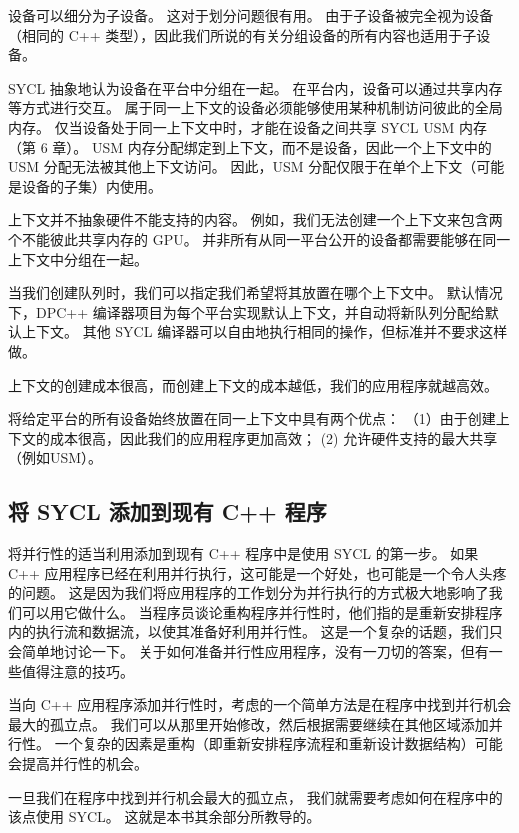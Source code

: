 设备可以细分为子设备。 这对于划分问题很有用。 
由于子设备被完全视为设备（相同的 C++ 类型），因此我们所说的有关分组设备的所有内容也适用于子设备。

SYCL 抽象地认为设备在平台中分组在一起。 在平台内，设备可以通过共享内存等方式进行交互。 
属于同一上下文的设备必须能够使用某种机制访问彼此的全局内存。 
仅当设备处于同一上下文中时，才能在设备之间共享 SYCL USM 内存（第 6 章）。 
USM 内存分配绑定到上下文，而不是设备，因此一个上下文中的 USM 分配无法被其他上下文访问。 
因此，USM 分配仅限于在单个上下文（可能是设备的子集）内使用。

上下文并不抽象硬件不能支持的内容。 
例如，我们无法创建一个上下文来包含两个不能彼此共享内存的 GPU。 
并非所有从同一平台公开的设备都需要能够在同一上下文中分组在一起。

当我们创建队列时，我们可以指定我们希望将其放置在哪个上下文中。 
默认情况下，DPC++ 编译器项目为每个平台实现默认上下文，并自动将新队列分配给默认上下文。 
其他 SYCL 编译器可以自由地执行相同的操作，但标准并不要求这样做。

\begin{remark}
	上下文的创建成本很高，而创建上下文的成本越低，我们的应用程序就越高效。
\end{remark}

将给定平台的所有设备始终放置在同一上下文中具有两个优点：
（1）由于创建上下文的成本很高，因此我们的应用程序更加高效； (2) 允许硬件支持的最大共享（例如USM）。

\subsection{将 SYCL 添加到现有 C++ 程序}
将并行性的适当利用添加到现有 C++ 程序中是使用 SYCL 的第一步。 
如果 C++ 应用程序已经在利用并行执行，这可能是一个好处，也可能是一个令人头疼的问题。 
这是因为我们将应用程序的工作划分为并行执行的方式极大地影响了我们可以用它做什么。 
当程序员谈论重构程序并行性时，他们指的是重新安排程序内的执行流和数据流，以使其准备好利用并行性。 
这是一个复杂的话题，我们只会简单地讨论一下。 
关于如何准备并行性应用程序，没有一刀切的答案，但有一些值得注意的技巧。

当向 C++ 应用程序添加并行性时，考虑的一个简单方法是在程序中找到并行机会最大的孤立点。 
我们可以从那里开始修改，然后根据需要继续在其他区域添加并行性。 
一个复杂的因素是重构（即重新安排程序流程和重新设计数据结构）可能会提高并行性的机会。

一旦我们在程序中找到并行机会最大的孤立点，
我们就需要考虑如何在程序中的该点使用 SYCL。 这就是本书其余部分所教导的。

